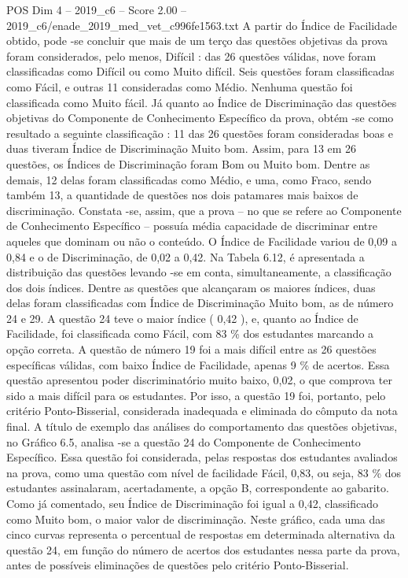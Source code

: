 \begin{textsample}{POS Dim 4 – 2019\_c6 – Score 2.00 – 2019\_c6/enade\_2019\_med\_vet\_c996fe1563.txt}
A partir do Índice de Facilidade obtido, pode -se concluir que mais de um terço das questões objetivas da prova foram considerados, pelo menos, Difícil : das 26 questões válidas, nove foram classificadas como Difícil ou como Muito difícil.
Seis questões foram classificadas como Fácil, e outras 11 consideradas como Médio.
Nenhuma questão foi classificada como Muito fácil.
Já quanto ao Índice de Discriminação das questões objetivas do Componente de Conhecimento Específico da prova, obtém -se como resultado a seguinte classificação : 11 das 26 questões foram consideradas boas e duas tiveram Índice de Discriminação Muito bom.
Assim, para 13 em 26 questões, os Índices de Discriminação foram Bom ou Muito bom.
Dentre as demais, 12 delas foram classificadas como Médio, e uma, como Fraco, sendo também 13, a quantidade de questões nos dois patamares mais baixos de discriminação.
Constata -se, assim, que a prova – no que se refere ao Componente de Conhecimento Específico – possuía média capacidade de discriminar entre aqueles que dominam ou não o conteúdo.
O Índice de Facilidade variou de 0,09 a 0,84 e o de Discriminação, de 0,02 a 0,42.
Na Tabela 6.12, é apresentada a distribuição das questões levando -se em conta, simultaneamente, a classificação dos dois índices.
Dentre as questões que alcançaram os maiores índices, duas delas foram classificadas com Índice de Discriminação Muito bom, as de número 24 e 29.
A questão 24 teve o maior índice ( 0,42 ), e, quanto ao Índice de Facilidade, foi classificada como Fácil, com 83 \% dos estudantes marcando a opção correta.
A questão de número 19 foi a mais difícil entre as 26 questões específicas válidas, com baixo Índice de Facilidade, apenas 9 \% de acertos.
Essa questão apresentou poder discriminatório muito baixo, 0,02, o que comprova ter sido a mais difícil para os estudantes.
Por isso, a questão 19 foi, portanto, pelo critério Ponto-Bisserial, considerada inadequada e eliminada do cômputo da nota final.
A título de exemplo das análises do comportamento das questões objetivas, no Gráfico 6.5, analisa -se a questão 24 do Componente de Conhecimento Específico.
Essa questão foi considerada, pelas respostas dos estudantes avaliados na prova, como uma questão com nível de facilidade Fácil, 0,83, ou seja, 83 \% dos estudantes assinalaram, acertadamente, a opção B, correspondente ao gabarito.
Como já comentado, seu Índice de Discriminação foi igual a 0,42, classificado como Muito bom, o maior valor de discriminação.
Neste gráfico, cada uma das cinco curvas representa o percentual de respostas em determinada alternativa da questão 24, em função do número de acertos dos estudantes nessa parte da prova, antes de possíveis eliminações de questões pelo critério Ponto-Bisserial.

\end{textsample}
